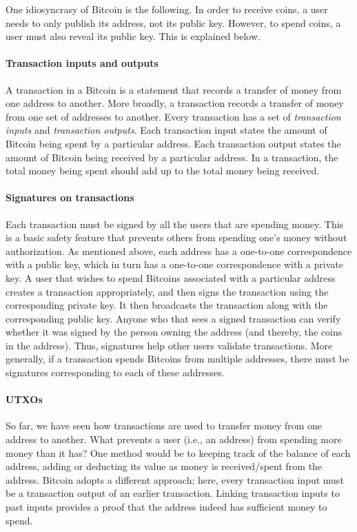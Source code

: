 \documentclass{article}
\begin{document}
One idiosyncrasy of Bitcoin is the following. In order to receive coins, a user needs to only publish its address, not its public key. However, to spend coins, a user must also reveal its public key. This is explained below.

\paragraph{Transaction inputs and outputs}
A transaction in a Bitcoin is a statement that records a transfer of money from one address to another. More broadly, a transaction records a transfer of money from one set of addresses to another. Every transaction has a set of \textit{transaction inputs} and \textit{transaction outputs}. Each transaction input states the amount of Bitcoin being spent by a particular address. Each transaction output states the amount of Bitcoin being received by a particular address. In a transaction, the total money being spent should add up to the total money being received. %

\paragraph{Signatures on transactions}
Each transaction must be signed by all the users that are spending money. This is a basic safety feature that prevents others from spending one's money without authorization. As mentioned above, each address has a one-to-one correspondence with a public key, which in turn has a one-to-one correspondence with a private key. A user that wishes to spend Bitcoins associated with a particular address creates a transaction appropriately, and then signs the transaction using the corresponding private key. It then broadcasts the transaction along with the corresponding public key. Anyone who that sees a signed transaction can verify whether it was signed by the person owning the address (and thereby, the coins in the address). Thus, signatures help other users validate transactions. More generally, if a transaction spends Bitcoins from multiple addresses, there must be signatures corresponding to each of these addresses.

\paragraph{UTXOs} So far, we have seen how transactions are used to transfer money from one address to another. What prevents a user (i.e., an address) from spending more money than it has? One method would be to keeping track of the balance of each address, adding or deducting its value as money is received/spent from the address. Bitcoin adopts a different approach; here, every transaction input must be a transaction output of an earlier transaction. Linking transaction inputs to past inputs provides a proof that the address indeed has sufficient money to spend. 
\end{document}
